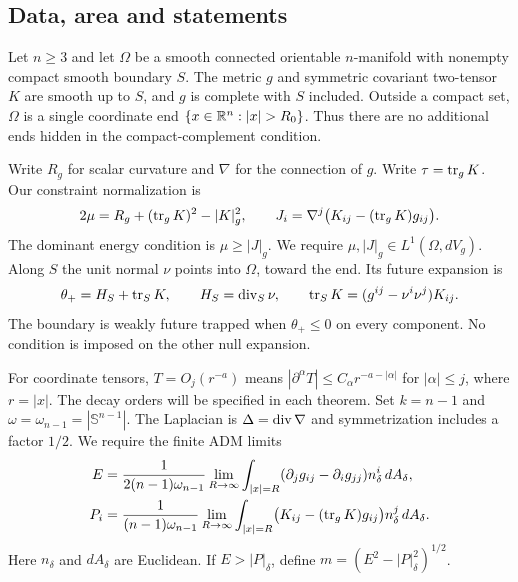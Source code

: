 \subsection{Data, area and statements}
\begin{definition}\label{def:data}
Let $n\geq3$ and let $\Omega$ be a smooth connected orientable
$n$-manifold with nonempty compact smooth boundary $S$. The metric $g$
and symmetric covariant two-tensor $K$ are smooth up to $S$, and $g$ is
complete with $S$ included. Outside a compact set, $\Omega$ is a single
coordinate end $\{x\in\R^n:|x|>R_0\}$. Thus there are no additional
ends hidden in the compact-complement condition.

Write $R_g$ for scalar curvature and $\nabla$ for the connection of $g$.
Write $\tau=\operatorname{tr}_gK$. Our constraint normalization is
\begin{equation}\label{eq:setting:constraints}
 2\mu=R_g+(\operatorname{tr}_gK)^2-|K|_g^2,\qquad
 J_i=\nabla^j\bigl(K_{ij}-(\operatorname{tr}_gK)g_{ij}\bigr).
\end{equation}
The dominant energy condition is $\mu\geq|J|_g$. We require
$\mu,|J|_g\in L^1(\Omega,dV_g)$. Along $S$ the unit normal $\nu$
points into $\Omega$, toward the end. Its future expansion is
\[
 \theta_+=H_S+\operatorname{tr}_SK,\qquad
 H_S=\operatorname{div}_S\nu,\qquad
 \operatorname{tr}_SK=(g^{ij}-\nu^i\nu^j)K_{ij}.
\]
The boundary is weakly future trapped when $\theta_+\leq0$ on every
component. No condition is imposed on the other null expansion.

For coordinate tensors, $T=O_j(r^{-a})$ means
$|\partial^\alpha T|\leq C_\alpha r^{-a-|\alpha|}$ for
$|\alpha|\leq j$, where $r=|x|$. The decay orders will be specified
in each theorem. Set $k=n-1$ and $\omega=\omega_{n-1}=|\mathbb S^{n-1}|$.
The Laplacian is $\Delta=\operatorname{div}\nabla$ and symmetrization includes a factor $1/2$. We require the
finite ADM limits
\begin{align}
 E&=\frac{1}{2(n-1)\omega_{n-1}}\lim_{R\to\infty}
  \int_{|x|=R}(\partial_jg_{ij}-\partial_i g_{jj})
       n_\delta^i\,dA_\delta,\label{eq:setting:energy}\\
 P_i&=\frac{1}{(n-1)\omega_{n-1}}\lim_{R\to\infty}
  \int_{|x|=R}\bigl(K_{ij}-(\operatorname{tr}_gK)g_{ij}\bigr)
       n_\delta^j\,dA_\delta.\label{eq:setting:momentum}
\end{align}
Here $n_\delta$ and $dA_\delta$ are Euclidean. If $E>|P|_\delta$, define
$m=(E^2-|P|_\delta^2)^{1/2}$.

\end{definition}

